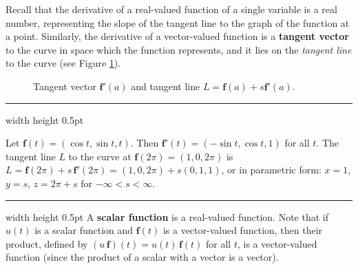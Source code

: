 Recall that the derivative of a real-valued function of a single variable is a real number, representing the slope of the tangent line to the graph of the function at a point. 
Similarly, the derivative of a vector-valued function is a
\textbf{tangent vector} to the curve in space which the function represents, and it lies on the
\emph{tangent line} to the curve (see
Figure \ref{fig:vectangent}).

\begin{figure}[h]
 \begin{center}
 \end{center}
 \caption[]{\quad Tangent vector $\mathbf{f}'(a)$ and tangent line $L = \mathbf{f}(a) + s \mathbf{f}'(a)$.}
 \label{fig:vectangent}
\end{figure}
\hrule width \textwidth height 0.5pt
\begin{exmp}
 Let $\mathbf{f}(t) = ( \cos t , \sin t , t )$. Then $\mathbf{f}'(t) = ( -\sin t , \cos t , 1 )$ for all $t$. The
 tangent line $L$ to the curve at $\mathbf{f}(2\pi) = (1,0,2\pi)$ is $L = \mathbf{f}(2\pi) + s\,\mathbf{f}'(2\pi) =
 (1,0,2\pi) + s(0,1,1)$, or in parametric form: $x = 1$, $y = s$, $z = 2\pi + s$ for $-\infty < s < \infty$.
\end{exmp}
\hrule width \textwidth height 0.5pt
\vskip3mm
A \textbf{scalar function} is a real-valued function. Note that if
$u(t)$ is a scalar function and $\mathbf{f}(t)$ is a vector-valued function, then their product, defined by
$(u\,\mathbf{f})(t) = u(t)\,\mathbf{f}(t)$ for all $t$, is a vector-valued function (since the product of a scalar
with a vector is a vector).

